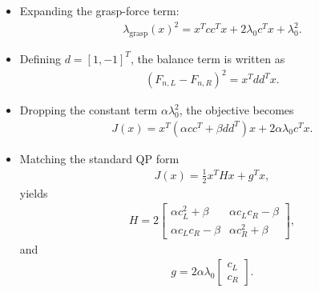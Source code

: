 \documentclass[conference]{IEEEtran}
\begin{document}
\begin{itemize}
    \item Expanding the grasp-force term:
    \begin{align}
        \lambda_{\mathrm{grasp}}(x)^2
        =
        x^{T}cc^{T}x
        +
        2\lambda_{0}c^{T}x
        +
        \lambda_{0}^{2}.
    \end{align}

    \item Defining
    \(d=[1,-1]^{T}\), the balance term is written as
    \begin{align}
        \left(F_{n,L}-F_{n,R}\right)^2
        =
        x^{T}dd^{T}x.
    \end{align}

    \item Dropping the constant term \(\alpha\lambda_{0}^{2}\), the objective becomes
    \begin{align}
        J(x)
        =
        x^{T}
        \left(
        \alpha cc^{T}
        +
        \beta dd^{T}
        \right)
        x
        +
        2\alpha\lambda_{0}c^{T}x.
    \end{align}

    \item Matching the standard QP form
    \begin{align}
        J(x)
        =
        \frac{1}{2}x^{T}Hx
        +
        g^{T}x,
    \end{align}
    yields
    \begin{align}
        H
        =
        2
        \begin{bmatrix}
            \alpha c_{L}^{2}+\beta &
            \alpha c_{L}c_{R}-\beta \\
            \alpha c_{L}c_{R}-\beta &
            \alpha c_{R}^{2}+\beta
        \end{bmatrix},
    \end{align}
    and
    \begin{align}
        g
        =
        2\alpha\lambda_{0}
        \begin{bmatrix}
            c_{L} \\
            c_{R}
        \end{bmatrix}.
    \end{align}
\end{itemize}
\end{document}
